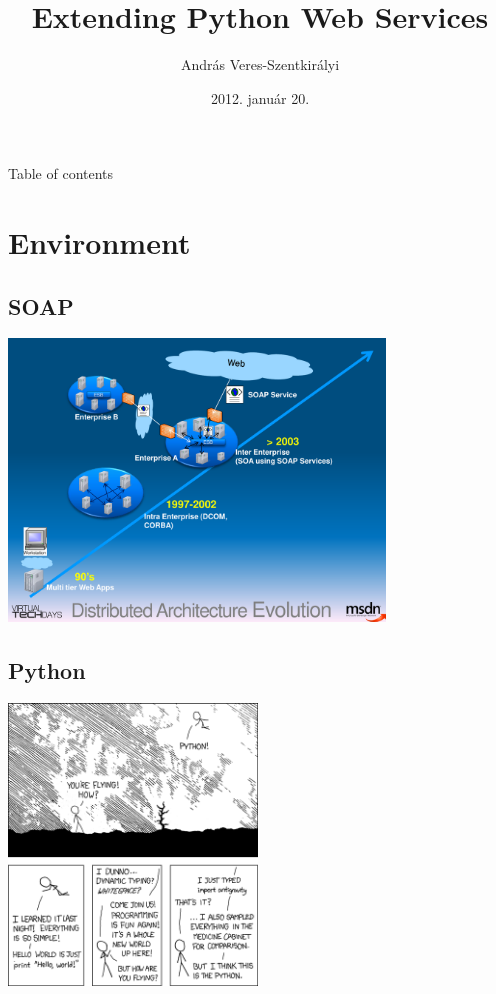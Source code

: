 \documentclass{beamer}
\author{András Veres-Szentkirályi}
\title{Extending Python Web Services}
\date{2012. január 20.}
\begin{document}
\frame{\titlepage}

\begin{frame}{Table of contents}
\tableofcontents
\end{frame}

\section{Environment}

\subsection{SOAP}

\begin{frame}
\begin{center}
 \includegraphics[height=7.5cm]{images/msdn-soap.pdf}
\end{center}
\end{frame}

\subsection{Python}

\begin{frame}
\begin{center}
 \includegraphics[height=7.5cm]{images/python.png}
\end{center}
\end{frame}
\end{document}
